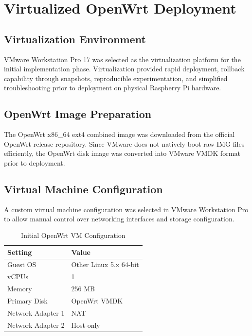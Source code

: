 \documentclass[conference]{IEEEtran}
\begin{document}
\section{Virtualized OpenWrt Deployment}

\subsection{Virtualization Environment}

VMware Workstation Pro 17 was selected as the virtualization platform for the initial implementation phase. Virtualization provided rapid deployment, rollback capability through snapshots, reproducible experimentation, and simplified troubleshooting prior to deployment on physical Raspberry Pi hardware.

\subsection{OpenWrt Image Preparation}

The OpenWrt x86\_64 ext4 combined image was downloaded from the official OpenWrt release repository. Since VMware does not natively boot raw IMG files efficiently, the OpenWrt disk image was converted into VMware VMDK format prior to deployment.

\subsection{Virtual Machine Configuration}

A custom virtual machine configuration was selected in VMware Workstation Pro to allow manual control over networking interfaces and storage configuration.

\begin{table}[H]
\centering
\caption{Initial OpenWrt VM Configuration}
\begin{tabular}{|l|l|}
\hline
Setting & Value \\ \hline
Guest OS & Other Linux 5.x 64-bit \\ \hline
vCPUs & 1 \\ \hline
Memory & 256 MB \\ \hline
Primary Disk & OpenWrt VMDK \\ \hline
Network Adapter 1 & NAT \\ \hline
Network Adapter 2 & Host-only \\ \hline
\end{tabular}
\end{table}
\end{document}

